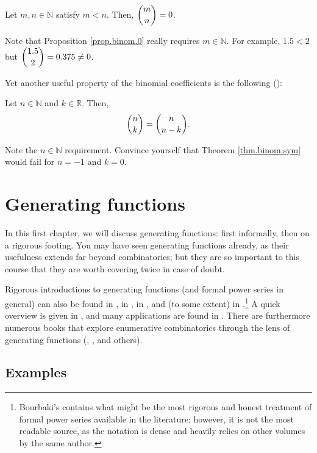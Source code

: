 \begin{proposition}
\label{prop.binom.0}Let $m,n\in\mathbb{N}$ satisfy $m<n$. Then, $\dbinom{m}%
{n}=0$.
\end{proposition}

Note that Proposition \ref{prop.binom.0} really requires $m\in\mathbb{N}$. For
example, $1.5<2$ but $\dbinom{1.5}{2}=0.375\neq0$.

Yet another useful property of the binomial coefficients is the following
(\cite[Theorem 1.3.11]{19fco}):

\begin{theorem}
\label{thm.binom.sym}Let
$n\in\mathbb{N}$ and $k\in\mathbb{R}$. Then,%
\[
\dbinom{n}{k}=\dbinom{n}{n-k}.
\]

\end{theorem}

Note the $n\in\mathbb{N}$ requirement. Convince yourself that Theorem
\ref{thm.binom.sym} would fail for $n=-1$ and $k=0$.

\section{\label{chap.gf}Generating functions}

In this first chapter, we will discuss generating functions: first informally,
then on a rigorous footing. You may have seen generating functions already, as
their usefulness extends far beyond combinatorics; but they are so important
to this course that they are worth covering twice in case of doubt.

Rigorous introductions to generating functions (and formal power series in
general) can also be found in \cite[Chapter 7 (in the 1st edition)]{Loehr-BC},
in \cite[Chapter 1]{Henric74}, in \cite{Sambal22}, and (to some extent) in
\cite[Chapter 7]{19s}.\footnote{Bourbaki's \cite[\S IV.4]{Bourba03} contains
what might be the most rigorous and honest treatment of formal power series
available in the literature; however, it is not the most readable source, as
the notation is dense and heavily relies on other volumes by the same author.}
A quick overview is given in \cite{Niven69}, and many applications are found
in \cite{Wilf09}. There are furthermore numerous books that explore
enumerative combinatorics through the lens of generating functions
(\cite{GouJac83}, \cite{Wagner08}, \cite{Lando03} and others).


\subsection{\label{sec.gf.exas}Examples}

